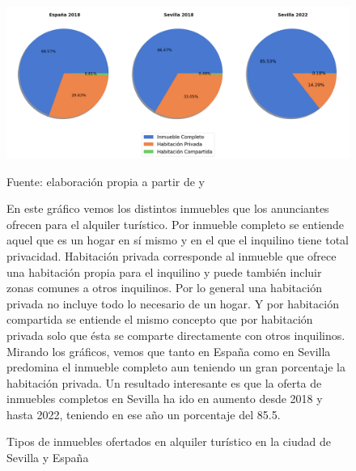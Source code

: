 \documentclass[a4paper,10pt]{article}
\begin{document}
            \begin{figure}[ht]
                \begin{center}
                    \includegraphics*[width = 17cm]{graphics/tipoinmueble.png}
                    \begin{flushright}
                        \footnotesize{Fuente: elaboración propia a partir de \cite[(1) y (2)]{datahippo} y \cite[(1)]{insideairbnb}}
                    \end{flushright}
                    \caption{Tipos de inmuebles ofertados en alquiler turístico en la ciudad de Sevilla y España}
                \end{center}

                En este gráfico vemos los distintos inmuebles que los anunciantes ofrecen para el alquiler turístico. Por inmueble
                completo se entiende aquel que es un hogar en sí mismo y en el que el inquilino tiene total privacidad. Habitación privada
                corresponde al inmueble que ofrece una habitación propia para el inquilino y puede también incluir zonas 
                comunes a otros inquilinos. Por lo general una habitación privada no incluye todo lo necesario de un hogar. Y por habitación 
                compartida se entiende el mismo concepto que por habitación privada solo que ésta se comparte directamente con otros inquilinos. 
                Mirando los gráficos, vemos que tanto en España como en Sevilla predomina el inmueble completo aun teniendo un gran porcentaje 
                la habitación privada. Un resultado interesante es que la oferta de inmuebles completos en Sevilla ha ido en aumento desde 2018 
                y hasta 2022, teniendo en ese año un porcentaje del 85.5.

            \end{figure}

    \clearpage
\end{document}
